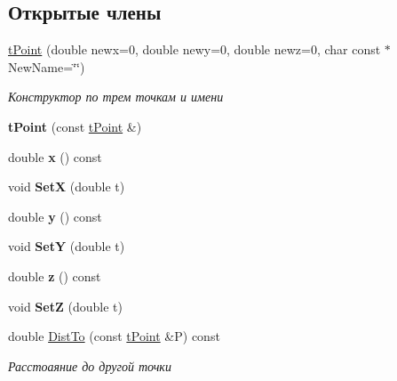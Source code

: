 \subsection*{Открытые члены}
\begin{DoxyCompactItemize}
\item 
\mbox{\label{classtPoint_a0f7b95c63108ff1996f993f76208e4ee}} 
\hyperlink{classtPoint_a0f7b95c63108ff1996f993f76208e4ee}{t\+Point} (double newx=0, double newy=0, double newz=0, char const $\ast$New\+Name=\char`\"{}\char`\"{})
\begin{DoxyCompactList}\small\item\em Конструктор по трем точкам и имени \end{DoxyCompactList}\item 
\mbox{\label{classtPoint_acd4d6c37b06415e10f037c29eeeb35d2}} 
{\bfseries t\+Point} (const \hyperlink{classtPoint}{t\+Point} \&)
\item 
\mbox{\label{classtPoint_adfae7cc9253854321270b51acedcbc4d}} 
double {\bfseries x} () const
\item 
\mbox{\label{classtPoint_ae7163ff0afe728da1be12f25844647e1}} 
void {\bfseries SetX} (double t)
\item 
\mbox{\label{classtPoint_a3386f8a21f2f962327ee32b2f77f52ee}} 
double {\bfseries y} () const
\item 
\mbox{\label{classtPoint_ad9fb0cb6d30b24d7478a1d585fe4a491}} 
void {\bfseries SetY} (double t)
\item 
\mbox{\label{classtPoint_a14ad204b83379ad64b0c8ad6af6c4eab}} 
double {\bfseries z} () const
\item 
\mbox{\label{classtPoint_a8da9a00e6d00624721b3dd9bb7a0df79}} 
void {\bfseries SetZ} (double t)
\item 
\mbox{\label{classtPoint_ae712421b8ca24bf96a5516acaf773624}} 
double \hyperlink{classtPoint_ae712421b8ca24bf96a5516acaf773624}{Dist\+To} (const \hyperlink{classtPoint}{t\+Point} \&P) const
\begin{DoxyCompactList}\small\item\em Расстоаяние до другой точки \end{DoxyCompactList}\item 

\end{DoxyCompactItemize}
